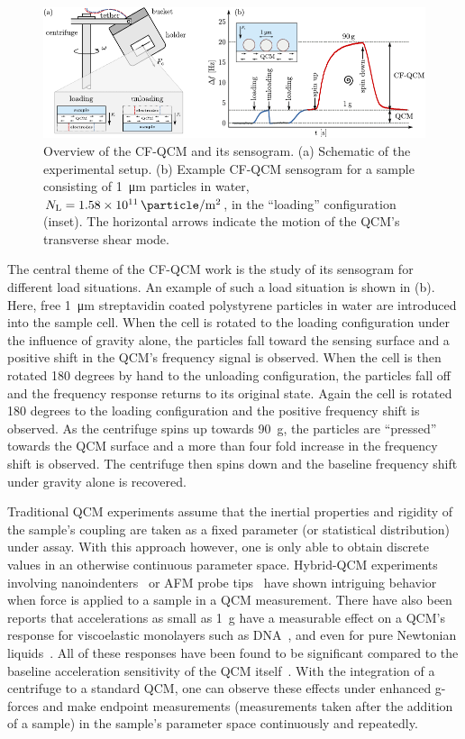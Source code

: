 \begin{figure}[ht]
\centering
\includegraphics[width=16cm,keepaspectratio]{qcm/figures/figure1.pdf}
\caption{Overview of the CF-QCM and its sensogram.  (a) Schematic of the
experimental setup.  (b) Example CF-QCM sensogram
for a sample consisting of \SI{1}{\micro\meter} particles in water,
$N_\mathrm{L}=\SI{1.58e11}{\particle\per\meter\squared}$, in the
``loading'' configuration (inset).  The horizontal arrows indicate the
motion of the QCM's transverse shear mode.  }
\label{fig:expsetup}
\end{figure}
The central theme of the CF-QCM work is the study of its sensogram for
different load situations.  An example of such a load situation is shown in
(b).  Here, free \SI{1}{\micro\meter} streptavidin
coated polystyrene particles in water are introduced into the sample cell.
When the cell is rotated to the loading configuration under the influence
of gravity alone, the particles fall toward the sensing surface and a
positive shift in the QCM's frequency signal is observed.  When the cell is
then rotated 180 degrees by hand to the unloading configuration, the
particles fall off and the frequency response returns to its original
state.  Again the cell is rotated 180 degrees to the loading configuration
and the positive frequency shift is observed.  As the centrifuge spins up
towards \SI{90}{g}, the particles are ``pressed'' towards the QCM surface
and a more than four fold increase in the frequency shift is observed.  The
centrifuge then spins down and the baseline frequency shift under gravity
alone is recovered.

Traditional QCM experiments assume that the inertial properties and
rigidity of the sample's coupling are taken as a fixed parameter (or
statistical distribution) under assay.  With this approach however, one is
only able to obtain discrete values in an otherwise continuous parameter
space.  Hybrid-QCM experiments involving
nanoindenters~\cite{borovsky2001measuring} or AFM probe
tips~\cite{richter2003pathways} have shown intriguing behavior when force
is applied to a sample in a QCM measurement.  There have also been reports
that accelerations as small as \SI{1}{g} have a measurable effect on a
QCM's response for viscoelastic monolayers such as
DNA~\cite{fawcett2004evidence}, and even for pure Newtonian
liquids~\cite{yoshimoto2002effect}.  All of these responses have been found
to be significant compared to the baseline acceleration sensitivity of the
QCM itself~\cite{filler1988acceleration}.  With the integration of a
centrifuge to a standard QCM, one can observe these effects under enhanced
g-forces and make endpoint measurements (measurements taken after the
addition of a sample) in the sample's parameter space continuously and
repeatedly.

